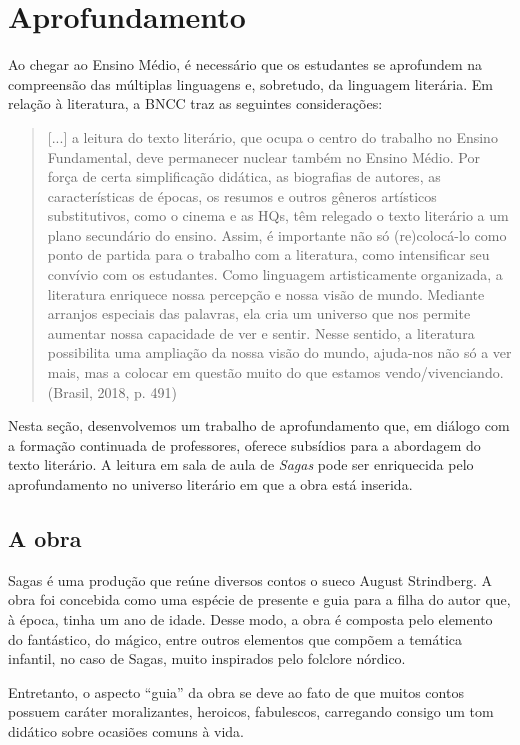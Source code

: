 \documentclass[12pt]{extarticle}
\begin{document}
\section{Aprofundamento}

Ao chegar ao Ensino Médio, é necessário que os estudantes se aprofundem
na compreensão das múltiplas linguagens e, sobretudo, da linguagem
literária. Em relação à literatura, a BNCC traz as seguintes
considerações:

\begin{quote}
{[}...{]} a leitura do texto literário, que ocupa o centro do trabalho
no Ensino Fundamental, deve permanecer nuclear também no Ensino Médio.
Por força de certa simplificação didática, as biografias de autores, as
características de épocas, os resumos e outros gêneros artísticos
substitutivos, como o cinema e as HQs, têm relegado o texto literário a
um plano secundário do ensino. Assim, é importante não só (re)colocá-lo
como ponto de partida para o trabalho com a literatura, como
intensificar seu convívio com os estudantes. Como linguagem
artisticamente organizada, a literatura enriquece nossa percepção e
nossa visão de mundo. Mediante arranjos especiais das palavras, ela cria
um universo que nos permite aumentar nossa capacidade de ver e sentir.
Nesse sentido, a literatura possibilita uma ampliação da nossa visão do
mundo, ajuda-nos não só a ver mais, mas a colocar em questão muito do
que estamos vendo/vivenciando. (Brasil, 2018, p. 491)
\end{quote}

Nesta seção, desenvolvemos um trabalho de aprofundamento que, em diálogo
com a formação continuada de professores, oferece subsídios para a
abordagem do texto literário. A leitura em sala de aula de \emph{Sagas}
pode ser enriquecida pelo aprofundamento no universo literário em que a
obra está inserida.

\subsection{A obra}

Sagas é uma produção que reúne diversos contos o sueco August
Strindberg. A obra foi concebida como uma espécie de presente e guia
para a filha do autor que, à época, tinha um ano de idade. Desse modo, a
obra é composta pelo elemento do fantástico, do mágico, entre outros
elementos que compõem a temática infantil, no caso de Sagas, muito
inspirados pelo folclore nórdico.

Entretanto, o aspecto ``guia'' da obra se deve ao fato de que muitos
contos possuem caráter moralizantes, heroicos, fabulescos, carregando
consigo um tom didático sobre ocasiões comuns à vida.
\end{document}
